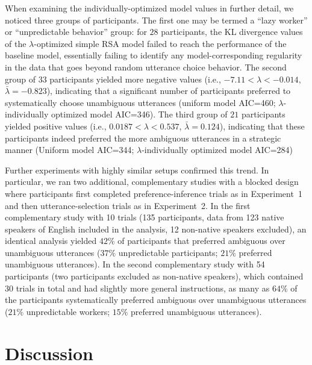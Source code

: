 \documentclass[11pt,a4paper]{article}
\begin{document}
When examining the individually-optimized model values in further detail, we noticed three groups of participants. 
The first one may be termed a ``lazy worker'' or ``unpredictable behavior'' group:
for $28$ participants, the KL divergence values of the $\lambda$-optimized simple RSA model failed to reach the performance of the baseline model, essentially failing to identify any model-corresponding regularity in the data that goes beyond random utterance choice behavior.
The second group of $33$ participants yielded more negative values (i.e., $-7.11<\lambda<-0.014$, $\bar{\lambda}=-0.823$), indicating that a significant number of participants preferred to systematically choose unambiguous utterances (uniform model AIC=460; $\lambda$-individually optimized model AIC=346). 
The third group of $21$ participants yielded positive values (i.e., $0.0187<\lambda<0.537$, $\bar{\lambda}=0.124$), indicating that these participants indeed preferred the more ambiguous utterances in a strategic manner (Uniform model AIC=344; $\lambda$-individually optimized model AIC=284)


Further experiments with highly similar setups confirmed this trend.
In particular, we ran two additional, complementary studies with a blocked design where participants first completed preference-inference trials as in Experiment~1 and then utterance-selection trials as in Experiment~2. 
In the first complementary study with 10 trials (135 participants, data from 123 native speakers of English included in the analysis, 12 non-native speakers excluded), an identical analysis yielded $42\%$ of participants that preferred ambiguous over unambiguous utterances ($37\%$ unpredictable participants; $21\%$ preferred unambiguous utterances). 
In the second complementary study with 54 participants (two participants excluded as non-native speakers), which contained 30 trials in total and had slightly more general instructions, as many as $64\%$ of the participants systematically preferred ambiguous over unambiguous utterances ($21\%$ unpredictable workers; $15\%$ preferred unambiguous utterances). 



\section{Discussion} \label{discussion}
\end{document}
